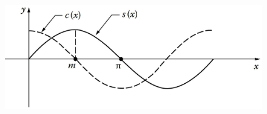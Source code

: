 \documentclass[12pt,a4paper]{article}
\begin{document}
\begin{figure}
\centering
\includegraphics[height=6.cm, angle=0]{sin_func.eps}
\caption{
}
\label{fig:sin_func}
\end{figure}
\end{document}
